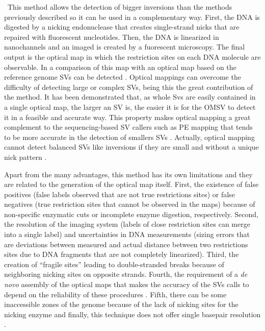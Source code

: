 \documentclass[a4paper,12pt]{article}
\begin{document}
\begin{itemize}
\
This method allows the detection of bigger inversions than the methods previously described so it can be used in a complementary way. First, the DNA is digested by a nicking endonuclease that creates single-strand nicks that are repaired with fluorescent nucleotides. Then, the DNA is linearized in nanochannels and an imaged is created by a fuorescent microscopy. The final output is the optical map in which the restriction sites on each DNA molecule are observable. In a comparison of this map with an optical map based on the reference genome SVs can be detected \cite{besenbacher_novel_2015, chin_phased_2016}.
Optical mappings can overcome the difficulty of detecting large or complex SVs, being this the great contribution of the method. It has been demonstrated that, as whole Svs are easily contained in a single optical map, the larger an SV  is, the easier it is for the OMSV to detect it in a feasible and accurate way. This property makes optical mapping a great complement to the sequencing-based SV callers such as PE mapping that tends to be more accurate in the detection of smallers SVs \cite{li_omsv_2017}. Actually, optical mapping cannot detect balanced SVs like inversions if they are small and without a unique nick pattern \cite{mak_genome-wide_2016}.
\

Apart from the many advantages, this method has its own limitations and they are related to the generation of the optical map itself. First, the existence of false positives (false labels observed that are not true restrictions sites) or false negatives (true restriction sites that cannot be observed in the maps) because of non-specific enzymatic cuts or incomplete enzyme digestion, respectively. Second, the resolution of the imaging system (labels of close restriction sites can merge into a single label) and uncertainties in DNA measurements (sizing errors that are deviations between measured and actual distance between two restrictions sites due to DNA fragments that are not completely linearized). Third, the creation of “fragile sites” leading to double-stranded breaks because of neighboring nicking sites on opposite strands. Fourth, the requirement of a {\em de novo} assembly of the optical maps that makes the accuracy of the SVs calls to depend on the reliability of these procedures \cite{li_omsv_2017, mak_genome-wide_2016}. Fifth, there can be some inaccessible zones of the genome because of the lack of nicking sites for the nicking enzyme and finally, this technique does not offer single basepair resolution \cite{levy-sakin_genome_2019}.


\end{itemize}
\end{document}
